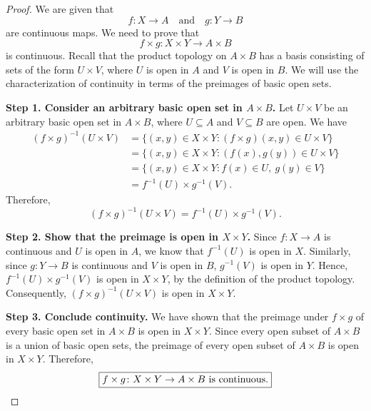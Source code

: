 
\begin{proof}
We are given that
\[ f\colon X\to A\quad\text{and}\quad g\colon Y\to B \]
are continuous maps. We need to prove that
\[ f\times g\colon X\times Y\to A\times B \]
is continuous. Recall that the product topology on $A\times B$ has a basis consisting of sets
of the form $U\times V$, where $U$ is open in $A$ and $V$ is open in $B$. We will use the
characterization of continuity in terms of the preimages of basic open sets.

\textbf{Step 1. Consider an arbitrary basic open set in $A\times B$.}
Let $U\times V$ be an arbitrary basic open set in $A\times B$, where $U\subseteq A$ and
$V\subseteq B$ are open. We have
\begin{align*}
  (f\times g)^{-1}(U\times V)
    &= \{(x,y)\in X\times Y : (f\times g)(x,y)\in U\times V\}\\
    &= \{(x,y)\in X\times Y : (f(x),g(y))\in U\times V\}\\
    &= \{(x,y)\in X\times Y : f(x)\in U,\ g(y)\in V\}\\
    &= f^{-1}(U)\times g^{-1}(V).
\end{align*}
Therefore,
\[ (f\times g)^{-1}(U\times V)=f^{-1}(U)\times g^{-1}(V). \]

\textbf{Step 2. Show that the preimage is open in $X\times Y$.}
Since $f\colon X\to A$ is continuous and $U$ is open in $A$, we know that $f^{-1}(U)$ is open
in $X$. Similarly, since $g\colon Y\to B$ is continuous and $V$ is open in $B$, $g^{-1}(V)$ is
open in $Y$. Hence, $f^{-1}(U)\times g^{-1}(V)$ is open in $X\times Y$, by the definition of the
product topology. Consequently, $(f\times g)^{-1}(U\times V)$ is open in $X\times Y$.

\textbf{Step 3. Conclude continuity.}
We have shown that the preimage under $f\times g$ of every basic open set in $A\times B$ is open
in $X\times Y$. Since every open subset of $A\times B$ is a union of basic open sets, the
preimage of every open subset of $A\times B$ is open in $X\times Y$. Therefore,
\[ \boxed{f\times g\colon X\times Y\to A\times B\text{ is continuous.}} \qedhere \]
\end{proof}
